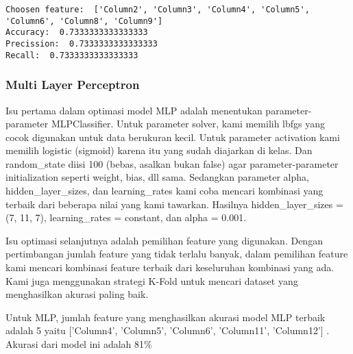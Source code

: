 \documentclass[11pt]{article}
\begin{document}
    \begin{Verbatim}[commandchars=\\\{\}]
Choosen feature:  ['Column2', 'Column3', 'Column4', 'Column5', 'Column6', 'Column8', 'Column9']
Accuracy:  0.7333333333333333
Precission:  0.7333333333333333
Recall:  0.7333333333333333

    \end{Verbatim}

    \subsubsection{Multi Layer Perceptron}\label{multi-layer-perceptron}

Isu pertama dalam optimasi model MLP adalah menentukan
parameter-parameter MLPClassifier. Untuk parameter solver, kami memilih
lbfgs yang cocok digunakan untuk data berukuran kecil. Untuk parameter
activation kami memilih logistic (sigmoid) karena itu yang sudah
diajarkan di kelas. Dan random\_state diisi 100 (bebas, asalkan bukan
false) agar parameter-parameter initialization seperti weight, bias, dll
sama. Sedangkan parameter alpha, hidden\_layer\_sizes, dan
learning\_rates kami coba mencari kombinasi yang terbaik dari beberapa
nilai yang kami tawarkan. Hasilnya hidden\_layer\_sizes = (7, 11, 7),
learning\_rates = constant, dan alpha = 0.001.

Isu optimasi selanjutnya adalah pemilihan feature yang digunakan. Dengan
pertimbangan jumlah feature yang tidak terlalu banyak, dalam pemilihan
feature kami mencari kombinasi feature terbaik dari keseluruhan
kombinasi yang ada. Kami juga menggunakan strategi K-Fold untuk mencari
dataset yang menghasilkan akurasi paling baik.

Untuk MLP, jumlah feature yang menghasilkan akurasi model MLP terbaik
adalah 5 yaitu {[}'Column4', 'Column5', 'Column6', 'Column11',
'Column12'{]} . Akurasi dari model ini adalah 81\%
\end{document}
